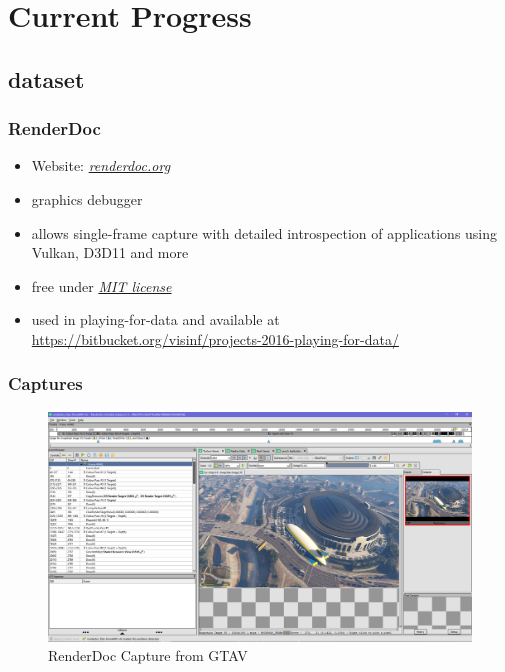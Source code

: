 \documentclass{beamer}
\begin{document}
%
%
%
%
%

\section{Current Progress}

\subsection{dataset}

\begin{frame}
	\frametitle{RenderDoc}
	\begin{itemize}
		\item Website: \href{https://renderdoc.org/}{\textit{renderdoc.org}}
		\item graphics debugger
		\item allows single-frame capture with detailed introspection of applications using Vulkan, D3D11 and more
		\item free under \href{https://opensource.org/licenses/MIT}{\textit{MIT license}}
		\item used in playing-for-data and available at \href{https://bitbucket.org/visinf/projects-2016-playing-for-data}{https://bitbucket.org/visinf/projects-2016-playing-for-data/}
	\end{itemize}
\end{frame}

\begin{frame}
	\frametitle{Captures}
	\begin{figure}
		\includegraphics[width=0.9\linewidth]{../images/renderdoc.PNG}
		\caption{RenderDoc Capture from GTAV}
	\end{figure}
\end{frame}
\end{document}
